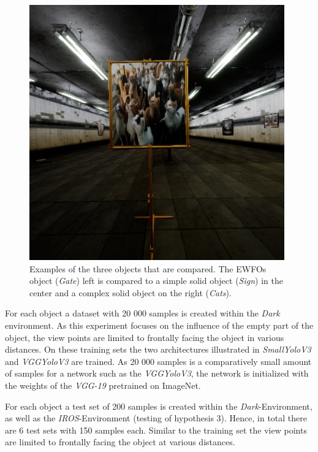 \begin{figure}[hbtp]
\begin{minipage}{0.3\textwidth}
	\end{minipage}
	\begin{minipage}{0.3\textwidth}
		\includegraphics[width=\textwidth]{fig/cats}
	\end{minipage}
	\caption{Examples of the three objects that are compared. The \acp{EWFO} object (\textit{Gate}) left is compared to a simple solid object (\textit{Sign}) in the center and a complex solid object on the right (\textit{Cats}).}
	\label{fig:cats}
\end{figure}

For each object a dataset with 20 000 samples is created within the \textit{Dark} environment. As this experiment focuses on the influence of the empty part of the object, the view points are limited to frontally facing the object in various distances. On these training sets the two architectures illustrated in  \textit{SmallYoloV3} and \textit{VGGYoloV3} are trained. As 20 000 samples is a comparatively small amount of samples for a network such as the \textit{VGGYoloV3}, the network is initialized with the weights of the \textit{VGG-19} pretrained on ImageNet.

For each object a test set of 200 samples is created within the \textit{Dark}-Environment, as well as the \textit{IROS}-Environment (testing of hypothesis 3). Hence, in total there are 6 test sets with 150 samples each. Similar to the training set the view points are limited to frontally facing the object at various distances.



